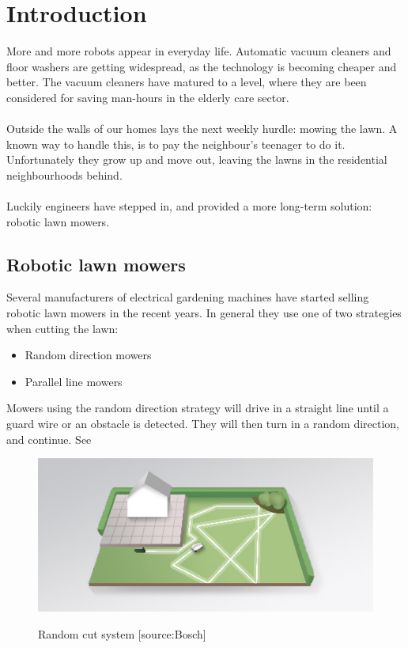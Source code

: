 \chapter{Introduction}
More and more robots appear in everyday life. Automatic vacuum cleaners and floor washers are getting widespread, as the technology is becoming cheaper and better. The vacuum cleaners have matured to a level, where they are been considered for saving man-hours in the elderly care sector.\\\\
\noindent
Outside the walls of our homes lays the next weekly hurdle: mowing the lawn. A known way to handle this, is to pay the neighbour's teenager to do it. Unfortunately they grow up and move out, leaving the lawns in the residential neighbourhoods behind.\\\\
\noindent
Luckily engineers have stepped in, and provided a more long-term solution: robotic lawn mowers.

\nopagebreak

\section{Robotic lawn mowers}
Several manufacturers of electrical gardening machines have started selling robotic lawn mowers in the recent years. In general they use one of two strategies when cutting the lawn:
\begin{itemize}
	\item Random direction mowers
	\item Parallel line mowers
\end{itemize}

\noindent
Mowers using the random direction strategy will drive in a straight line until a guard wire or an obstacle is detected. They will then turn in a random direction, and continue. See 

\begin{figure}[H]
\centering
\includegraphics[scale=0.8]{figures/noLogiCut.jpg} 
\label{fig:randomcut}
\caption{Random cut system [source:Bosch]} 
\end{figure}

